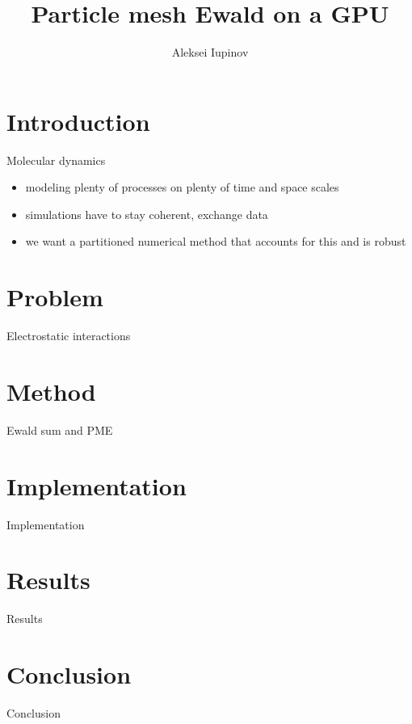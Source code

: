 \documentclass[11pt]{beamer}
\author{Aleksei Iupinov}
\title{Particle mesh Ewald on a GPU}
\institute{KTH Royal Institute of Technology}
\begin{document}
\begin{frame}
\titlepage
\end{frame}

\begin{frame}
\tableofcontents
\end{frame}

\section{Introduction}
\begin{frame}{Molecular dynamics}

\begin{itemize}
\item modeling plenty of processes on plenty of time and space scales
\item simulations have to stay coherent, exchange data
\item we want a partitioned numerical method that accounts for this and is robust
\end{itemize}

\end{frame}

\section{Problem}
\begin{frame}{Electrostatic interactions}
\end{frame}

\section{Method}
\begin{frame}{Ewald sum and PME}
\end{frame}

\section{Implementation}
\begin{frame}{Implementation}
\end{frame}

\section{Results}
\begin{frame}{Results}
\end{frame}

\section{Conclusion}
\begin{frame}{Conclusion}
\end{frame}
\end{document}
